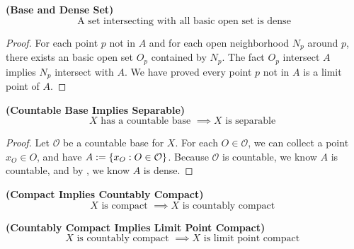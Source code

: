 \documentclass{report}
\begin{document}
\begin{theorem}
\label{2.3.4}
\textbf{(Base and Dense Set)} 
\begin{equation}
\text{ A set intersecting with all basic open set is dense }
\end{equation}
\end{theorem}
\begin{proof}
For each point $p$ not in $A$ and for each open neighborhood $N_p$ around $p$, there exists an basic open set  $O_p$ contained by $N_p$. The fact  $O_p$ intersect $A$ implies  $N_p$ intersect with  $A$. We have proved every point  $p$ not in $A $ is a limit point of $A$.
\end{proof}
\begin{corollary}
\label{2.3.5}
\textbf{(Countable Base Implies Separable)} 
\begin{equation}
X\text{ has a countable base }\implies X\text{ is separable }
\end{equation}
\end{corollary}
\begin{proof}
Let $\mathcal{O}$ be a countable base for $X$. For each $O\in \mathcal{O}$, we can collect a point $x_O\in O$, and have $A:=\{ x_O:O\in \mathcal{O} \}$. Because $\mathcal{O}$ is countable, we know $A$ is countable, and by  , we know $A$ is dense.
\end{proof}
\begin{theorem}
\label{2.3.6}
\textbf{(Compact Implies Countably Compact)} 
\begin{equation}
 X\text{ is compact }\implies X\text{ is countably compact }
\end{equation}
\end{theorem}
\begin{theorem}
\label{2.3.7}
\textbf{(Countably Compact Implies Limit Point Compact)} 
\begin{equation}
X\text{ is countably compact }\implies X\text{ is limit point compact }
\end{equation}
\end{theorem}
\end{document}
